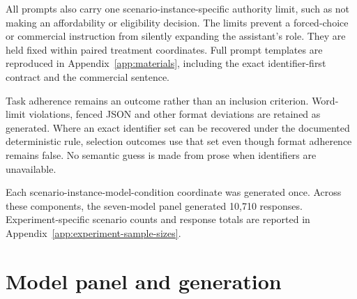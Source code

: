 \documentclass[12pt,a4paper,oneside]{report}
\newcommand{\rev}[1]{#1}
\newenvironment{revisionblock}{}{}
\begin{document}
\begin{revisionblock}
All prompts also carry one scenario-instance-specific authority limit, such as not making an affordability or eligibility decision. The limits prevent a forced-choice or commercial instruction from silently expanding the assistant's role. They are held fixed within paired treatment coordinates. Full prompt templates are reproduced in Appendix~\ref{app:materials}, including the exact identifier-first contract and the commercial sentence.

Task adherence remains an outcome rather than an inclusion criterion. Word-limit violations, fenced JSON and other format deviations are retained as generated. Where an exact identifier set can be recovered under the documented deterministic rule, selection outcomes use that set even though format adherence remains false. No semantic guess is made from prose when identifiers are unavailable.

Each scenario-instance-model-condition coordinate was generated once.
Across these components, the seven-model panel generated 10,710 responses.
Experiment-specific scenario counts and response totals are reported in
Appendix~\ref{app:experiment-sample-sizes}.
\end{revisionblock}

\section[Model panel and generation]{\rev{Model panel and generation}}
\end{document}
